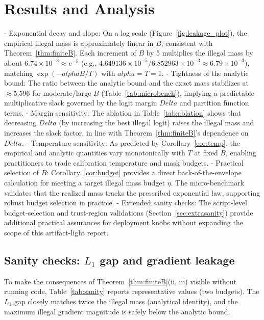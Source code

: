 \documentclass{article}
\def\alpha{alpha}%
\def\Delta{Delta}%
\begin{document}
\section{Results and Analysis}\label{sec:results-main}
- Exponential decay and slope: On a log scale (Figure~\ref{fig:leakage_plot}), the empirical illegal mass is approximately linear in $B$, consistent with Theorem~\ref{thm:finiteB}. Each increment of $B$ by 5 multiplies the illegal mass by about $6.74\times 10^{-3}\approx e^{-5}$ (e.g., $4.649136\times 10^{-5} / 6.852963\times 10^{-3}\approx 6.79\times 10^{-3}$), matching $\exp(-\alpha B/T)$ with $\alpha=T=1$.
- Tightness of the analytic bound: The ratio between the analytic bound and the exact mass stabilizes at $\approx 5.596$ for moderate/large $B$ (Table~\ref{tab:microbench}), implying a predictable multiplicative slack governed by the logit margin $\Delta$ and partition function terms.
- Margin sensitivity: The ablation in Table~\ref{tab:ablation} shows that decreasing $\Delta$ (by increasing the best illegal logit) raises the illegal mass and increases the slack factor, in line with Theorem~\ref{thm:finiteB}'s dependence on $\Delta$.
- Temperature sensitivity: As predicted by Corollary~\ref{cor:temp}, the empirical and analytic quantities vary monotonically with $T$ at fixed $B$, enabling practitioners to trade calibration temperature and mask budgets.
- Practical selection of $B$: Corollary~\ref{cor:budget} provides a direct back-of-the-envelope calculation for meeting a target illegal mass budget $\eta$. The micro-benchmark validates that the realized mass tracks the prescribed exponential law, supporting robust budget selection in practice.
- Extended sanity checks: The script-level budget-selection and trust-region validations (Section~\ref{sec:extrasanity}) provide additional practical assurances for deployment knobs without expanding the scope of this artifact-light report.

\subsection{Sanity checks: $L_1$ gap and gradient leakage}
To make the consequences of Theorem~\ref{thm:finiteB}(ii, iii) visible without running code, Table~\ref{tab:sanity} reports representative values (two budgets). The $L_1$ gap closely matches twice the illegal mass (analytical identity), and the maximum illegal gradient magnitude is safely below the analytic bound.
\end{document}
